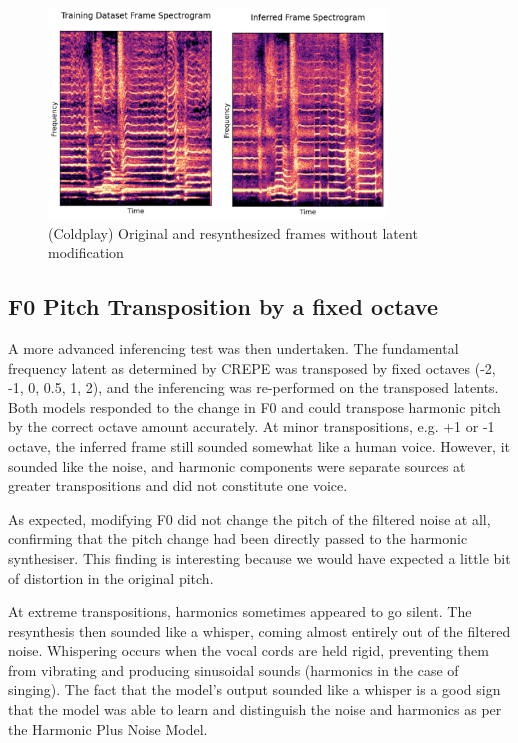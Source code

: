 \begin{figure}[H]
    \centering
    \includegraphics[width=0.8\textwidth]{research/results/Coldplay/InferredRecreation.png}
    \caption{(Coldplay) Original and resynthesized frames without latent modification}
\end{figure}

\subsection{F0 Pitch Transposition by a fixed octave}

A more advanced inferencing test was then undertaken. The fundamental frequency latent as determined by CREPE was transposed by fixed octaves (-2, -1, 0, 0.5, 1, 2), and the inferencing was re-performed on the transposed latents. Both models responded to the change in F0 and could transpose harmonic pitch by the correct octave amount accurately. At minor transpositions, e.g. +1 or -1 octave, the inferred frame still sounded somewhat like a human voice. However, it sounded like the noise, and harmonic components were separate sources at greater transpositions and did not constitute one voice.

As expected, modifying F0 did not change the pitch of the filtered noise at all, confirming that the pitch change had been directly passed to the harmonic synthesiser. This finding is interesting because we would have expected a little bit of distortion in the original pitch.

At extreme transpositions, harmonics sometimes appeared to go silent. The resynthesis then sounded like a whisper, coming almost entirely out of the filtered noise. Whispering occurs when the vocal cords are held rigid, preventing them from vibrating and producing sinusoidal sounds (harmonics in the case of singing). The fact that the model's output sounded like a whisper is a good sign that the model was able to learn and distinguish the noise and harmonics as per the Harmonic Plus Noise Model\cite{HarmonicPlusNoise}\cite{OriginalDDSP}.

